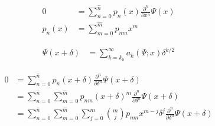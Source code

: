 \documentclass[a4paper,10pt,fleqn]{scrartcl}
\begin{document}
    \begin{align*}
        0
        &=
        \sum_{n=0}^{\hat n}
        p_n(x)
        \frac{\partial^n}{\partial x^n}
        \Psi(x) \\
        p_n(x)
        &=
        \sum_{m=0}^{\hat m}
        p_{nm}
        x^m
    \end{align*}

    \begin{align*}
        \Psi(x+\delta)
        &=
        \sum_{k=k_0}^\infty a_k(\Psi;x)\delta^{k/2}
    \end{align*}

    \begin{align*}
        0
        &=
        \sum_{n=0}^{\hat n}
        p_n(x+\delta)
        \frac{\partial^n}{\partial \delta^n}
        \Psi(x+\delta)
        \\
        &=
        \sum_{n=0}^{\hat n}
        \sum_{m=0}^{\hat m}
        p_{nm} (x+\delta)^m
        \frac{\partial^n}{\partial \delta^n}
        \Psi(x+\delta)
        \\
        &=
        \sum_{n=0}^{\hat n}
        \sum_{m=0}^{\hat m}
        \sum_{j=0}^m
        \binom{m}{j}
        p_{nm} x^{m-j}
        \delta^j
        \frac{\partial^n}{\partial \delta^n}
        \Psi(x+\delta)
    \end{align*}
\end{document}
